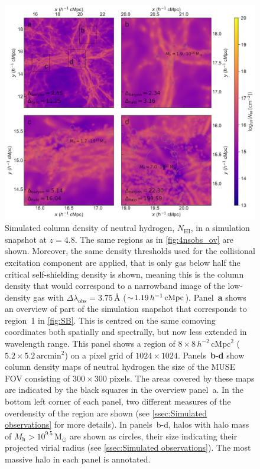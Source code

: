 \begin{figure}
    \centering
    \includegraphics[width=\linewidth]{"Plots/Chapter1/Column_density"}
    \caption[Observed column density at $z=4.8$]
    {Simulated column density of neutral hydrogen, $N_\text{HI}$, in a simulation snapshot at $z=4.8$. The same regions as in \cref{fig:4nsobs_ov} are shown. Moreover, the same density thresholds used for the collisional excitation component are applied, that is only gas below half the critical self-shielding density is shown, meaning this is the column density that would correspond to a narrowband image of the low-density gas with $\Delta \lambda_\text{obs} = 3.75 \, \text{\AA}$ ($\sim \! 1.19 \, h^{-1} \, \mathrm{cMpc}$). Panel~\textbf{a} shows an overview of part of the simulation snapshot that corresponds to region~1 in \cref{fig:SB}. This is centred on the same comoving coordinates both spatially and spectrally, but now less extended in wavelength range. This panel shows a region of $8 \times 8 \, h^{-2} \, \mathrm{cMpc}^2$ ($5.2 \times 5.2 \, \mathrm{arcmin}^2$) on a pixel grid of $1024 \times 1024$. Panels~\textbf{b}-\textbf{d} show column density maps of neutral hydrogen the size of the MUSE FOV consisting of $300 \times 300$ pixels. The areas covered by these maps are indicated by the black squares in the overview panel~a. In the bottom left corner of each panel, two different measures of the overdensity of the region are shown (see \cref{ssec:Simulated observations} for more details). In panels~b-d, halos with halo mass of $M_\mathrm{h} > 10^{9.5} \, \mathrm{M_\odot}$ are shown as circles, their size indicating their projected virial radius (see \cref{ssec:Simulated observations}). The most massive halo in each panel is annotated.}
    \label{fig:NHI}
\end{figure}
